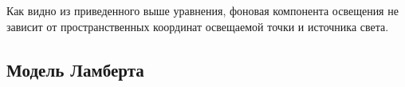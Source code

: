 Как видно из приведенного выше уравнения, фоновая компонента освещения не зависит от пространственных координат освещаемой точки и источника света.

%
%
%
%

%
%
%
%

\subsection{Модель Ламберта}

